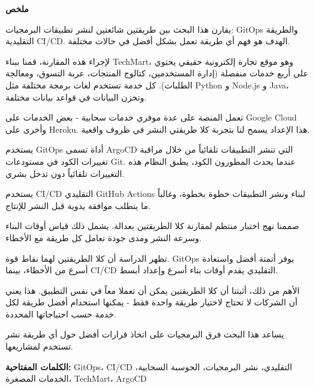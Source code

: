 \thispagestyle{empty}

\begin{center}
{\Large \textbf{\textarabic{ملخص}}}
\end{center}

\vspace{1cm}

\begin{otherlanguage}{arabic}
\begin{RTL}

يقارن هذا البحث بين طريقتين شائعتين لنشر تطبيقات البرمجيات: GitOps والطريقة التقليدية CI/CD. الهدف هو فهم أي طريقة تعمل بشكل أفضل في حالات مختلفة.

لإجراء هذه المقارنة، قمنا ببناء TechMart، وهو موقع تجارة إلكترونية حقيقي يحتوي على أربع خدمات منفصلة (إدارة المستخدمين، كتالوج المنتجات، عربة التسوق، ومعالجة الطلبات). كل خدمة تستخدم لغات برمجة مختلفة مثل Python و Node.js و Java، وتخزن البيانات في قواعد بيانات مختلفة.

تعمل المنصة على عدة موفري خدمات سحابية - بعض الخدمات على Google Cloud وأخرى على Heroku. هذا الإعداد يسمح لنا بتجربة كلا طريقتي النشر في ظروف واقعية.

يستخدم GitOps أداة تسمى ArgoCD التي تنشر التطبيقات تلقائياً من خلال مراقبة تغييرات الكود في مستودعات Git. عندما يحدث المطورون الكود، يطبق النظام هذه التغييرات تلقائياً دون تدخل بشري.

يستخدم CI/CD التقليدي GitHub Actions لبناء ونشر التطبيقات خطوة بخطوة، وغالباً ما يتطلب موافقة يدوية قبل النشر للإنتاج.

صممنا نهج اختبار منتظم لمقارنة كلا الطريقتين بعدالة. يشمل ذلك قياس أوقات البناء وسرعة النشر ومدى جودة تعامل كل طريقة مع الأخطاء.

تظهر الدراسة أن كلا الطريقتين لهما نقاط قوة. GitOps يوفر أتمتة أفضل واستعادة أسرع من الأخطاء، بينما CI/CD التقليدي يقدم أوقات بناء أسرع وإعداد أبسط.

الأهم من ذلك، أثبتنا أن كلا الطريقتين يمكن أن تعملا معاً في نفس التطبيق. هذا يعني أن الشركات لا تحتاج لاختيار طريقة واحدة فقط - يمكنها استخدام أفضل طريقة لكل خدمة حسب احتياجاتها المحددة.

يساعد هذا البحث فرق البرمجيات على اتخاذ قرارات أفضل حول أي طريقة نشر تستخدم لمشاريعها.

\textbf{الكلمات المفتاحية:} GitOps، CI/CD التقليدي، نشر البرمجيات، الحوسبة السحابية، الخدمات المصغرة، TechMart، ArgoCD

\end{RTL}
\end{otherlanguage}

\newpage